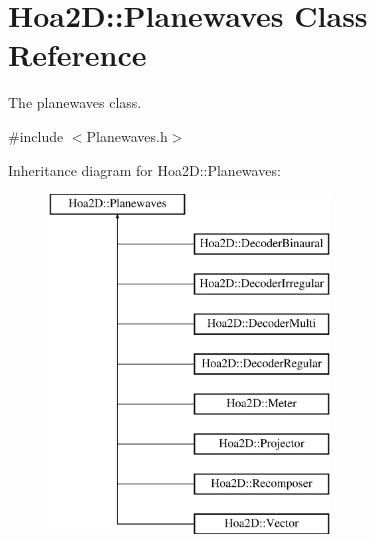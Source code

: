 \hypertarget{class_hoa2_d_1_1_planewaves}{\section{Hoa2\-D\-:\-:Planewaves Class Reference}
\label{class_hoa2_d_1_1_planewaves}
}


The planewaves class.  




{\ttfamily \#include $<$Planewaves.\-h$>$}

Inheritance diagram for Hoa2\-D\-:\-:Planewaves\-:\begin{figure}[H]
\begin{center}
\leavevmode
\includegraphics[height=9.000000cm]{class_hoa2_d_1_1_planewaves}
\end{center}
\end{figure}
